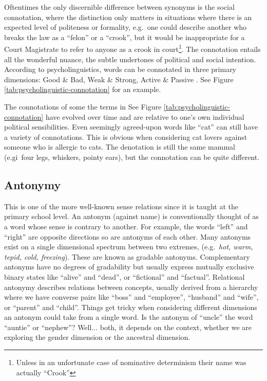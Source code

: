Oftentimes the only discernible difference between synonyms is the social connotation, where the distinction only matters in situations where there is an expected level of politeness or formality, e.g.\ one could describe another who breaks the law as a ``felon'' or a ``crook'', but it would be inappropriate for a Court Magistrate to refer to anyone as a crook in court\footnote{Unless in an unfortunate case of nominative determinism their name was actually ``Crook''}. The connotation entails all the wonderful nuance, the subtle undertones of political and social intention. According to psycholinguistics, words can be connotated in three primary dimensions: Good \& Bad, Weak \& Strong, Active \& Passive \cite{osgood1957measurement}. See Figure \ref{tab:psycholinguistic-connotation} for an example.

The connotations of some the terms in See Figure \ref{tab:psycholinguistic-connotation} have evolved over time and are relative to one's own individual political sensibilities. Even seemingly agreed-upon words like ``cat'' can still have a variety of connotations. This is obvious when considering cat lovers against someone who is allergic to cats. The denotation is still the same mammal (e.gi\ four legs, whiskers, pointy ears), but the connotation can be quite different.


\subsection{Antonymy}
This is one of the more well-known sense relations since it is taught at the primary school level. An antonym (against name) is conventionally thought of as a word whose sense is contrary to another. For example, the words ``left'' and ``right'' are opposite directions so are antonyms of each other. Many antonyms exist on a single dimensional spectrum between two extremes, (e.g.\ \textit{hot, warm, tepid, cold, freezing}). These are known as gradable antonyms. Complementary antonyms have no degrees of gradability but usually express mutually exclusive binary states like ``alive'' and ``dead'', or ``fictional'' and ``factual''. Relational antonymy describes relations between concepts, usually derived from a hierarchy where we have converse pairs like ``boss'' and ``employee'', ``husband'' and ``wife'', or ``parent'' and ``child''. Things get tricky when considering different dimensions an antonym could take from a single word. Is the antonym of ``uncle'' the word ``auntie'' or ``nephew''? Well... both, it depends on the context, whether we are exploring the gender dimension or the ancestral dimension. 

